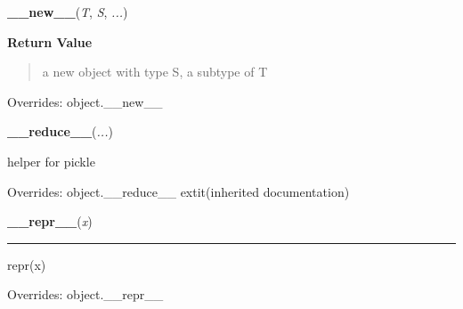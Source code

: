 \hspace{.8\funcindent}\begin{boxedminipage}{\funcwidth}

    \raggedright \textbf{\_\_new\_\_}(\textit{T}, \textit{S}, \textit{...})

\setlength{\parskip}{2ex}
\setlength{\parskip}{1ex}
      \textbf{Return Value}
    \vspace{-1ex}

      \begin{quote}
      a new object with type S, a subtype of T

      \end{quote}

      Overrides: object.\_\_new\_\_

    \end{boxedminipage}

    \vspace{0.5ex}

\hspace{.8\funcindent}\begin{boxedminipage}{\funcwidth}

    \raggedright \textbf{\_\_reduce\_\_}(\textit{...})

\setlength{\parskip}{2ex}
    helper for pickle

\setlength{\parskip}{1ex}
      Overrides: object.\_\_reduce\_\_ 	extit{(inherited documentation)}

    \end{boxedminipage}

    \vspace{0.5ex}

\hspace{.8\funcindent}\begin{boxedminipage}{\funcwidth}

    \raggedright \textbf{\_\_repr\_\_}(\textit{x})

    \vspace{-1.5ex}

    \rule{\textwidth}{0.5\fboxrule}
\setlength{\parskip}{2ex}
    repr(x)

\setlength{\parskip}{1ex}
      Overrides: object.\_\_repr\_\_

    \end{boxedminipage}

    \label{resource:struct_rusage:__rmul__}

    \vspace{0.5ex}

